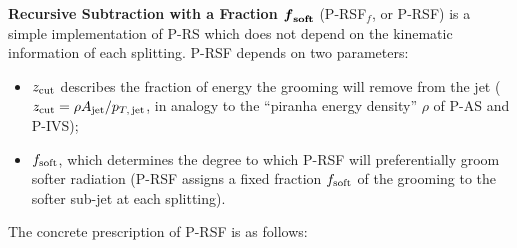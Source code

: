 \textbf{Recursive Subtraction with a Fraction \(\boldsymbol{f}_{\rm\bf soft}\)} (P-RSF\(_f\), or P-RSF) is a simple implementation of P-RS which does not depend on the kinematic information of each splitting.
%
P-RSF depends on two parameters:
%
\begin{itemize}
    \item
    \(z_{\rm cut}\) describes the fraction of energy the grooming will remove from the jet (\(z_{\rm cut} = \rho A_{\rm jet} / p_{T,\,\rm jet}\), in analogy to the ``piranha energy density'' \(\rho\) of P-AS and P-IVS);

    \item
    \(f_{\rm soft}\), which determines the degree to which P-RSF will preferentially groom softer radiation (P-RSF assigns a fixed fraction \(f_{\rm soft}\) of the grooming to the softer sub-jet at each splitting).
\end{itemize}
%
The concrete prescription of P-RSF is as follows:
